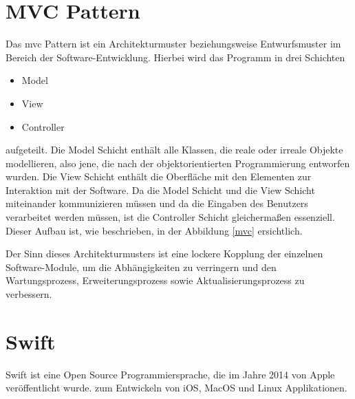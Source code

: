 \section{MVC Pattern}
Das \gls{mvc} Pattern ist ein Architekturmuster beziehungsweise Entwurfsmuster im Bereich der Software-Entwicklung. 
Hierbei wird das Programm in drei Schichten
\begin{itemize}
	\item Model
	\item View
	\item Controller
\end{itemize}
aufgeteilt. Die Model Schicht enthält alle Klassen, die reale oder irreale Objekte modellieren, also jene, die nach der objektorientierten Programmierung entworfen wurden. Die View Schicht enthält die Oberfläche mit den Elementen zur Interaktion mit der Software. Da die Model Schicht und die View Schicht miteinander kommunizieren müssen und da die Eingaben des Benutzers verarbeitet werden müssen, ist die Controller Schicht gleichermaßen essenziell. Dieser Aufbau ist, wie beschrieben, in der Abbildung \ref{mvc} ersichtlich.


Der Sinn dieses Architekturmusters ist eine lockere Kopplung der einzelnen Software-Module, um die Abhängigkeiten zu verringern und den Wartungsprozess, Erweiterungsprozess sowie Aktualisierungsprozess zu verbessern.

\clearpage

\section{Swift}
Swift ist eine Open Source Programmiersprache, die im Jahre 2014 von Apple veröffentlicht wurde. zum Entwickeln von iOS, MacOS und Linux Applikationen.


\clearpage
